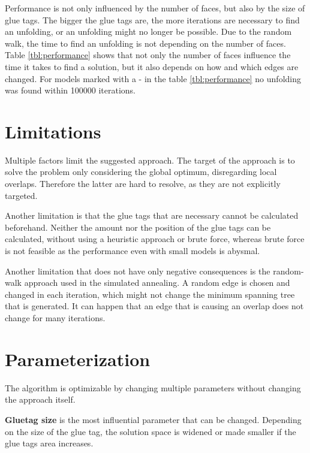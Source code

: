 \documentclass[draft,final]{vutinfth} %
\begin{document}
\label{tbl:performance}
\endgroup

Performance is not only influenced by the number of faces, but also by the size of glue tags. The bigger the glue tags are, the more iterations are necessary to find an unfolding, or an unfolding might no longer be possible. Due to the random walk, the time to find an unfolding is not depending on the number of faces. Table \ref{tbl:performance} shows that not only the number of faces influence the time it takes to find a solution, but it also depends on how and which edges are changed. For models marked with a - in the table \ref{tbl:performance} no unfolding was found within 100000 iterations.

\section{Limitations}
\label{sec:limitations}

Multiple factors limit the suggested approach. The target of the approach is to solve the problem only considering the global optimum, disregarding local overlaps. Therefore the latter are hard to resolve, as they are not explicitly targeted.

Another limitation is that the glue tags that are necessary cannot be calculated beforehand. Neither the amount nor the position of the glue tags can be calculated, without using a heuristic approach or brute force, whereas brute force is not feasible as the performance even with small models is abysmal.

Another limitation that does not have only negative consequences is the random-walk approach used in the simulated annealing. A random edge is chosen and changed in each iteration, which might not change the minimum spanning tree that is generated. It can happen that an edge that is causing an overlap does not change for many iterations.

\section{Parameterization}

The algorithm is optimizable by changing multiple parameters without changing the approach itself.

\textbf{Gluetag size} is the most influential parameter that can be changed. Depending on the size of the glue tag, the solution space is widened or made smaller if the glue tags area increases.
\end{document}
